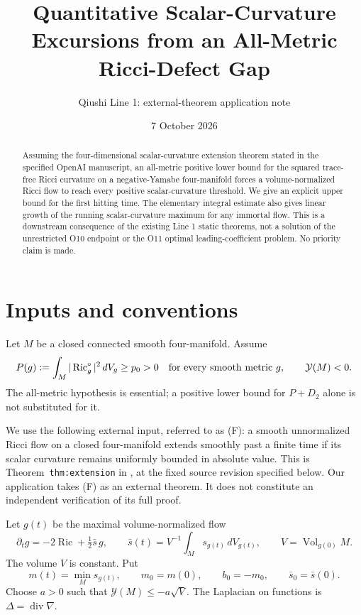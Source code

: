 \documentclass[11pt]{article}
\title{Quantitative Scalar-Curvature Excursions from an All-Metric Ricci-Defect Gap}
\author{Qiushi Line 1: external-theorem application note}
\date{7 October 2026}
\theoremstyle{remark}\newtheorem{remark}[theorem]{Remark}
\newcommand{\Ric}{\operatorname{Ric}}
\newcommand{\Vol}{\operatorname{Vol}}
\newcommand{\Yam}{\mathcal Y}
\begin{document}
\maketitle

\begin{abstract}
Assuming the four-dimensional scalar-curvature extension theorem stated
in the specified OpenAI manuscript, an all-metric positive lower bound
for the squared trace-free Ricci curvature on a negative-Yamabe
four-manifold forces a volume-normalized Ricci flow to reach every
positive scalar-curvature threshold. We give an explicit upper bound
for the first hitting time. The elementary integral estimate also gives
linear growth of the running scalar-curvature maximum for any immortal
flow. This is a downstream consequence of the existing Line 1 static
theorems, not a solution of the unrestricted O10 endpoint or the O11
optimal leading-coefficient problem. No priority claim is made.
\end{abstract}

\section{Inputs and conventions}
Let $M$ be a closed connected smooth four-manifold. Assume
\begin{equation}
 P(g):=\int_M|\Ric_g^\circ|^2\,dV_g\ge p_0>0
 \quad\hbox{for every smooth metric }g,
 \qquad \Yam(M)<0.\label{eq:static}
\end{equation}
The all-metric hypothesis is essential; a positive lower bound for
$P+D_2$ alone is not substituted for it.

We use the following external input, referred to as (F): a smooth
unnormalized Ricci flow on a closed four-manifold extends smoothly
past a finite time if its scalar curvature remains uniformly bounded
in absolute value. This is Theorem~\texttt{thm:extension} in
\cite{OAIFlow}, at the fixed source revision specified below.
Our application takes (F) as an external theorem. It does not constitute
an independent verification of its full proof.

Let $g(t)$ be the maximal volume-normalized flow
\begin{equation}
 \partial_tg=-2\Ric+\tfrac12\bar s\,g,
 \qquad \bar s(t)=V^{-1}\int_Ms_{g(t)}\,dV_{g(t)},
 \qquad V=\Vol_{g(0)}M.\label{eq:flow}
\end{equation}
The volume $V$ is constant. Put
\[
 m(t)=\min_Ms_{g(t)},\qquad m_0=m(0),\qquad
 b_0=-m_0,\qquad\bar s_0=\bar s(0).
\]
Choose $a>0$ such that $\Yam(M)\le-a\sqrt V$.
The Laplacian on functions is $\Delta=\operatorname{div}\nabla$.
\end{document}

